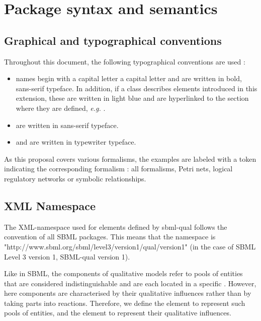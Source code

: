 
\section{Package syntax and semantics}

\subsection*{Graphical and typographical conventions} %

Throughout this document, the following typographical conventions are used :
\begin{itemize}
	\item {} names begin with a capital letter a capital letter and are written in bold, sans-serif typeface. In addition, if a class describes elements introduced in this extension, these are written in light blue and are hyperlinked to the section where they are defined, \emph{e.g.} .
	\item {} are written in sans-serif typeface.
	\item {} and  are written in typewriter typeface.
\end{itemize}

As this proposal covers various formalisms, the examples are labeled with a token indicating the corresponding formalism : \ALL all formalisms, \PN Petri nets, \LRG logical regulatory networks or \SYM symbolic relationships.


\subsection*{XML Namespace} %

The XML-namespace used for elements defined by sbml-qual follows the convention of all SBML packages. This means that the namespace is "http://www.sbml.org/sbml/level3/version1/qual/version1" (in the case of SBML Level 3 version 1, SBML-qual version 1).



Like  in SBML, the components of qualitative models refer to pools of entities that are considered indistinguishable and are each located in a specific . However, here components are characterised by their qualitative influences rather than by taking parts into reactions. Therefore, we define the  element to represent such pools of entities, and the  element to represent their qualitative influences.

